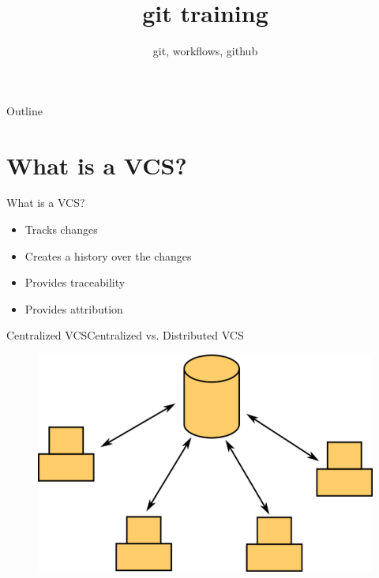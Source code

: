 \documentclass[aspectratio=169]{beamer}
\title {git training}
\subtitle{git, workflows, github}
\begin{document}
\begin{frame}
\titlepage
\end{frame}

\begin{frame}{Outline}
    \tableofcontents
\end{frame}

\section{What is a VCS?}
\begin{frame}{What is a VCS?}
\begin{itemize}
    \item Tracks changes
    \item Creates a history over the changes
    \item Provides traceability
    \item Provides attribution
\end{itemize}
\end{frame}

\begin{frame}{Centralized VCS}{Centralized vs. Distributed VCS}
\begin{figure}
    \centering
    \includegraphics[width=\textwidth,height=0.6\textheight,keepaspectratio]{01_centralized_vcs}
\end{figure}
\end{frame}
\end{document}
